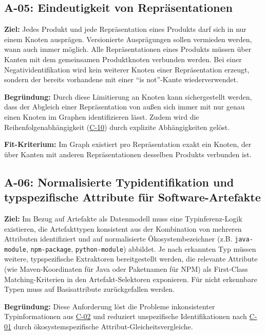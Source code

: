 \subsection{A-05: Eindeutigkeit von Repräsentationen}\label{subsec:req-unique-product-representations}

\textbf{Ziel:}
Jedes Produkt und jede Repräsentation eines Produkts darf sich in nur einem Knoten ausprägen.
Versionierte Ausprägungen sollen vermieden werden, wann auch immer möglich.
Alle Repräsentationen eines Produkts müssen über Kanten mit dem gemeinsamen Produktknoten verbunden werden.
Bei einer Negatividentifikation wird kein weiterer Knoten einer Repräsentation erzeugt, sondern der bereits vorhandene mit einer \enquote{is not}-Kante wiederverwendet.

\textbf{Begründung:}
Durch diese Limitierung an Knoten kann sichergestellt werden, dass der Abgleich einer Repräsentation von außen sich immer mit nur genau einen Knoten im Graphen identifizieren lässt.
Zudem wird die Reihenfolgenabhängigkeit (\hyperref[subsec:c-10-order-dependency]{C-10}) durch explizite Abhängigkeiten gelöst.

\textbf{Fit-Kriterium:}
Im Graph existiert pro Repräsentation exakt ein Knoten, der über Kanten mit anderen Repräsentationen desselben Produkts verbunden ist.

\subsection{A-06: Normalisierte Typidentifikation und typspezifische Attribute für Software-Artefakte}\label{subsec:req-type-specific-matching}

\textbf{Ziel:}
Im Bezug auf Artefakte als Datenmodell muss eine Typinferenz-Logik existieren, die Artefakttypen konsistent aus der Kombination von mehreren Attributen identifiziert und auf normalisierte Ökosystembezeichner (z.B. \texttt{java-module}, \texttt{npm-package}, \texttt{python-module}) abbildet.
Je nach erkannten Typ müssen weitere, typspezifische Extraktoren bereitgestellt werden, die relevante Attribute (wie Maven-Koordinaten für Java oder Paketnamen für NPM) als First-Class Matching-Kriterien in den Artefakt-Selektoren exponieren.
Für nicht erkennbare Typen muss auf Basisattribute zurückgefallen werden.

\textbf{Begründung:}
Diese Anforderung löst die Probleme inkonsistenter Typinformationen aus \hyperref[subsec:c-02-uneindeutige-artefakt-typinformation]{C-02} und reduziert unspezifische Identifikationen nach \hyperref[subsec:c-01-unspezifische-identifikation-von-artefakten]{C-01} durch ökosystemspezifische Attribut-Gleicheitsvergleiche.


